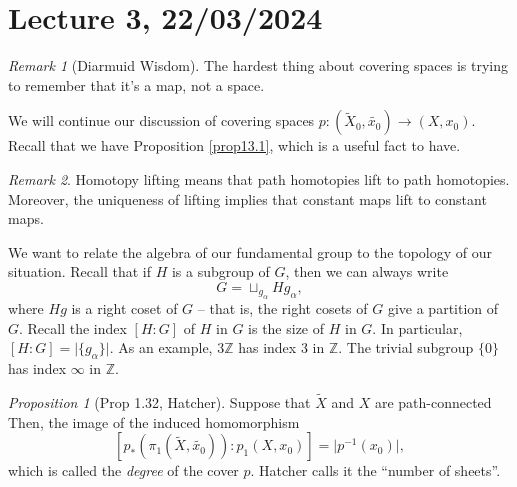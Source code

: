 \documentclass[a4paper]{report}
\theoremstyle{definition}
\theoremstyle{remark}
\newtheorem{remark}{Remark}
\theoremstyle{proposition}
\newtheorem{proposition}{Proposition}
\theoremstyle{conjecture}
\theoremstyle{lemma}
\theoremstyle{corollary}
\theoremstyle{exercise}
\begin{document}
\section{Lecture 3, 22/03/2024}

\begin{remark}[Diarmuid Wisdom]
    The hardest thing about covering spaces is trying to remember 
    that it's a map, not a space.
\end{remark}

We will continue our discussion of covering spaces 
$p : (\widetilde{X}_0, \widetilde{x_0}) \to (X,x_0)$.
Recall that we have Proposition \ref{prop13.1}, which is a
useful fact to have.

\begin{remark}
    Homotopy lifting means that path homotopies lift to path homotopies.
    Moreover, the uniqueness of lifting implies that constant 
    maps lift to constant maps.
\end{remark}

We want to relate the algebra of our fundamental group to the topology of 
our situation. Recall that if $H$ is a subgroup of $G$, then we 
can always write $$G = \sqcup_{g_\alpha} Hg_\alpha,$$ 
where $Hg$ is a right coset of $G$ -- that is, the right cosets of $G$ 
give a partition of $G$. Recall the index $[H:G]$ of $H$ in $G$ is the 
size of $H$ in $G$. In particular, 
$[H:G] = \vert \lbrace g_\alpha \rbrace\vert$.
As an example, $3\mathbb{Z}$ has index $3$ in $\mathbb{Z}$. 
The trivial subgroup $\lbrace 0 \rbrace$ has index $\infty$ 
in $\mathbb{Z}$.

\begin{proposition}[Prop 1.32, Hatcher]\label{prop1.32}
    Suppose that $\widetilde{X}$ and $X$ are path-connected 
    Then, the image of the induced homomorphism 
    $$\left[p_\ast\left(\pi_1(\widetilde{X},\widetilde{x_0})\right) : p_1(X,x_0)\right] = \vert p^{-1}(x_0)\vert,$$
    which is called the \emph{degree} of the cover $p$. Hatcher calls it the 
    ``number of sheets''.
\end{proposition}
\end{document}
